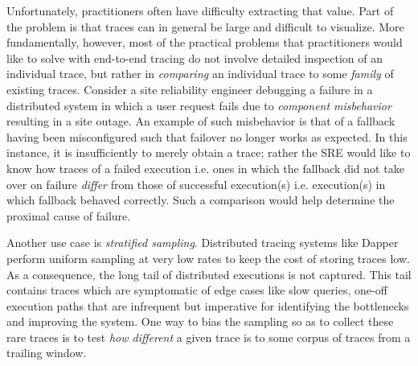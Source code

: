 Unfortunately, practitioners often have difficulty extracting that value. Part of the problem is that traces can in general be large and difficult to visualize.  More fundamentally, however, most of the practical problems that practitioners would like to solve with end-to-end tracing do not involve detailed inspection of an individual trace, but rather in \emph{comparing} an individual trace to some \emph{family} of existing traces. Consider a site reliability engineer debugging a failure in a distributed system in which a user request fails due to \emph{component misbehavior} resulting in a site outage. An example of such misbehavior is that of a fallback having been misconfigured such that failover no longer works as expected. In this instance, it is insufficiently to merely obtain a trace; rather the SRE would like to know how traces of a failed execution i.e. ones in which the fallback did not take over on failure \emph{differ} from those of successful execution(s) i.e. execution(s) in which fallback behaved correctly. Such a comparison would help determine the proximal cause of failure. 

Another use case is \emph{stratified sampling}. Distributed tracing systems like Dapper~\cite{36356} perform uniform sampling at very low rates to keep the cost of storing traces low.  As a consequence, the long tail of distributed executions is not captured. This tail contains traces which are symptomatic of edge cases like slow queries, one-off execution paths that are infrequent but imperative for identifying the bottlenecks and improving the system. One way to bias the sampling so as to collect these rare traces is to test \emph{how different} a given trace is to some corpus of traces from a trailing window.


